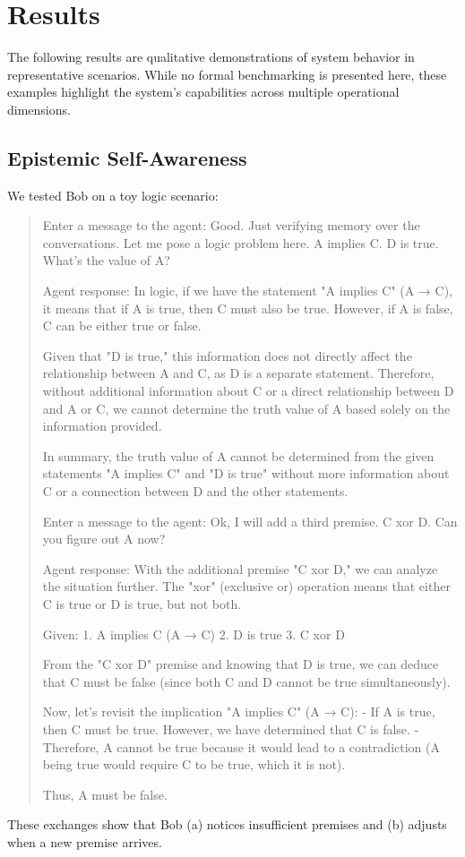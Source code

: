 \documentclass[conference]{IEEEtran}
\begin{document}
\section{Results}

The following results are qualitative demonstrations 
of system behavior in representative scenarios. 
While no formal benchmarking is presented here, 
these examples highlight the system’s capabilities
across multiple operational dimensions.

\subsection{Epistemic Self-Awareness}
We tested Bob on a toy logic scenario:
\begin{quote}

  Enter a message to the agent: Good.  Just verifying memory 
  over the conversations.  Let me pose a logic problem here.  
  A implies C.  D is true.  What's the value of A?
  
  Agent response: In logic, if we have the statement "A implies C" (A → C), 
  it means that if A is true, then C must also be true. 
  However, if A is false, C can be either true or false.
  
  Given that "D is true," this information does not directly 
  affect the relationship between A and C, as D 
  is a separate statement. Therefore, without additional information 
  about C or a direct relationship between D and A or C, 
  we cannot determine the truth value of A based 
  solely on the information provided.
  
  In summary, the truth value of A cannot be determined 
  from the given statements "A implies C" and "D is true" 
  without more information about C or a connection 
  between D and the other statements.

  Enter a message to the agent: Ok, I will add a third premise.  
  C xor D.  Can you figure out A now?

  Agent response: With the additional premise "C xor D," 
  we can analyze the situation further. The "xor" (exclusive or) 
  operation means that either C is true or D is true, but not both.
  
  Given:
  1. A implies C (A → C)
  2. D is true
  3. C xor D
  
  From the "C xor D" premise and knowing that D is true, 
  we can deduce that C must be false (since both C and D 
  cannot be true simultaneously).
  
  Now, let's revisit the implication "A implies C" (A → C):
  - If A is true, then C must be true. However,
    we have determined that C is false.
  - Therefore, A cannot be true because it would lead to a 
    contradiction (A being true would require C to be true,
     which it is not).
  
  Thus, A must be false.

\end{quote}
These exchanges show that Bob (a) notices insufficient premises and (b) adjusts when a new premise arrives. 
\end{document}
